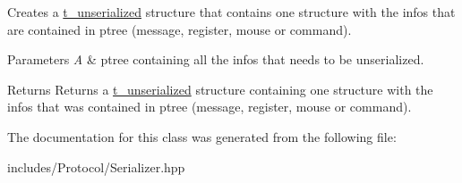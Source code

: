 Creates a \hyperlink{structt__unserialized}{t\+\_\+unserialized} structure that contains one structure with the infos that are contained in ptree (message, register, mouse or command). 


\begin{DoxyParams}{Parameters}
{\em A} & ptree containing all the infos that needs to be unserialized. \\
\hline
\end{DoxyParams}
\begin{DoxyReturn}{Returns}
Returns a \hyperlink{structt__unserialized}{t\+\_\+unserialized} structure containing one structure with the infos that was contained in ptree (message, register, mouse or command). 
\end{DoxyReturn}


The documentation for this class was generated from the following file\+:\begin{DoxyCompactItemize}
\item 
includes/\+Protocol/Serializer.\+hpp\end{DoxyCompactItemize}
